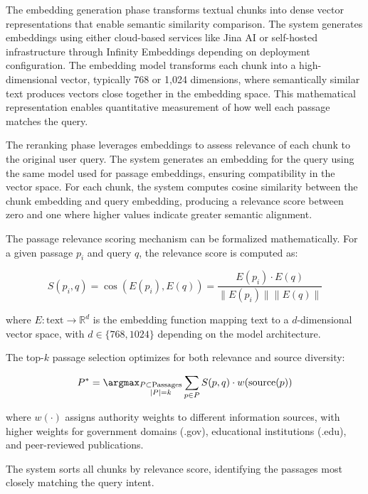The embedding generation phase transforms textual chunks into dense vector representations that enable semantic similarity comparison. The system generates embeddings using either cloud-based services like Jina AI or self-hosted infrastructure through Infinity Embeddings depending on deployment configuration. The embedding model transforms each chunk into a high-dimensional vector, typically 768 or 1,024 dimensions, where semantically similar text produces vectors close together in the embedding space. This mathematical representation enables quantitative measurement of how well each passage matches the query.

The reranking phase leverages embeddings to assess relevance of each chunk to the original user query. The system generates an embedding for the query using the same model used for passage embeddings, ensuring compatibility in the vector space. For each chunk, the system computes cosine similarity between the chunk embedding and query embedding, producing a relevance score between zero and one where higher values indicate greater semantic alignment. 

The passage relevance scoring mechanism can be formalized mathematically. For a given passage $p_i$ and query $q$, the relevance score is computed as:

\begin{equation}
S(p_i, q) = \cos(E(p_i), E(q)) = \frac{E(p_i) \cdot E(q)}{\|E(p_i)\| \|E(q)\|}
\label{eq:relevance_score}
\end{equation}

where $E: \text{text} \to \mathbb{R}^d$ is the embedding function mapping text to a $d$-dimensional vector space, with $d \in \{768, 1024\}$ depending on the model architecture.

The top-$k$ passage selection optimizes for both relevance and source diversity:

\begin{equation}
P^* = \argmax_{\substack{P \subset \text{Passages} \\ |P| = k}} \sum_{p \in P} S(p, q) \cdot w(\text{source}(p))
\label{eq:topk_selection}
\end{equation}

where $w(\cdot)$ assigns authority weights to different information sources, with higher weights for government domains (.gov), educational institutions (.edu), and peer-reviewed publications.

The system sorts all chunks by relevance score, identifying the passages most closely matching the query intent.

